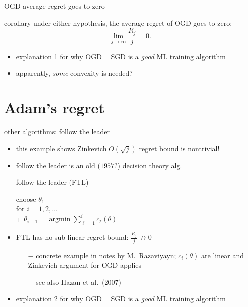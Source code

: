 \documentclass[xcolor={svgnames},
               hyperref={colorlinks,citecolor=DeepPink4,linkcolor=FireBrick,urlcolor=Maroon}]
               {beamer}
\newcommand{\argmin}{\operatorname{argmin}}
\newcommand{\ds}{\displaystyle}
\begin{document}
\begin{frame}{OGD average regret goes to zero}

\begin{block}{corollary}
under either hypothesis, the average regret of OGD goes to zero:
    $$\lim_{j\to\infty} \frac{R_j}{j} = 0.$$
\end{block}

\begin{itemize}
\item explanation 1 for why OGD$=$SGD is a \emph{good} ML training algorithm
\item apparently, \emph{some} convexity is needed?
\end{itemize}
\end{frame}


\section{Adam's regret}

\begin{frame}{other algorithms: follow the leader}

\begin{itemize}
\item this example shows Zinkevich $O(\sqrt{j})$ regret bound is nontrivial!
\item follow the leader is an old ($1957$?) decision theory alg.

\begin{block}{follow the leader (FTL)}

\begin{pseudo*}
\st{choose} $\theta_1$ \\
for $i = 1,2,\dots$ \\+
    $\ds \theta_{i+1} = \argmin \sum_{\ell=1}^i c_\ell(\theta)$
\end{pseudo*}
\end{block}

\item FTL has no sub-linear regret bound: $\ds \frac{R_j}{j} \nrightarrow 0$
    \begin{itemize}
    \item[$-$] concrete example in \href{https://cpb-us-e1.wpmucdn.com/sites.usc.edu/dist/3/137/files/2017/02/lec24-2bywoz5.pdf}{notes by M.~Razaviyayn}; $c_i(\theta)$ are linear and Zinkevich argument for OGD applies
    \item[$-$] see also Hazan et al.~(2007)
    \end{itemize}
\item explanation 2 for why OGD$=$SGD is a \emph{good} ML training algorithm
\end{itemize}
\end{frame}
\end{document}
